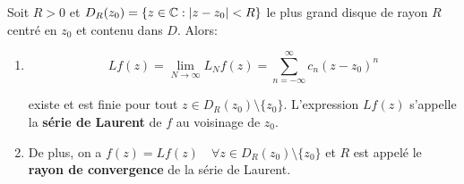 \begin{result}[11.2, p.80]
    Soit $R > 0$ et $D_R(z_0) = \{ z \in \mathbb{C} : \left|z - z_0\right| < R \}$ le plus grand disque de rayon $R$ centré en $z_0$ et contenu dans $D$.
    Alors:
    
    \begin{enumerate}[label=\arabic{enumi})]
        \item 
        \[ Lf(z) = \lim_{N \rightarrow \infty} L_N f(z) = \sum_{n = -\infty}^\infty c_n (z - z_0)^n \]
        
        existe et est finie pour tout $z \in D_R(z_0) \setminus \{z_0\}$.
        L'expression $Lf(z)$ s'appelle la \textbf{série de Laurent} de $f$ au voisinage de $z_0$.
        
        \item 
        De plus, on a $f(z) = Lf(z) \quad \forall z \in D_R(z_0) \setminus \{z_0\}$ et $R$ est appelé le \textbf{rayon de convergence} de la série de Laurent.
    \end{enumerate}
\end{result}

